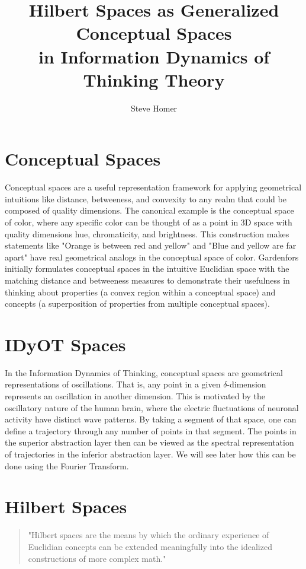\documentclass{MastersDoctoralThesis}
\title{\textbf{Hilbert Spaces as Generalized Conceptual Spaces} \\
in Information Dynamics of Thinking Theory}
\author{Steve Homer}
\begin{document}
\maketitle

\section{Conceptual Spaces}
Conceptual spaces are a useful representation framework for applying geometrical intuitions like distance, betweeness, and convexity to any realm that could be composed of quality dimensions.  The canonical example is the conceptual space of color, where any specific color can be thought of as a point in 3D space with quality dimensions hue, chromaticity, and brightness.  This construction makes statements like "Orange is between red and yellow" and "Blue and yellow are far apart" have real geometrical analogs in the conceptual space of color.  Gardenfors initially formulates conceptual spaces in the intuitive Euclidian space with the matching distance and betweeness measures to demonstrate their usefulness in thinking about properties (a convex region within a conceptual space) and concepts (a superposition of properties from multiple conceptual spaces). 

\section{IDyOT Spaces}
In the Information Dynamics of Thinking, conceptual spaces are geometrical representations of oscillations.  That is, any point in a given $\delta$-dimension represents an oscillation in another dimension. This is motivated by the oscillatory nature of the human brain, where the electric fluctuations of neuronal activity have distinct wave patterns. By taking a segment of that space, one can define a trajectory through any number of points in that segment.  The points in the superior abstraction layer then can be viewed as the spectral representation of trajectories in the inferior abstraction layer.  We will see later how this can be done using the Fourier Transform.

\section{Hilbert Spaces}

\begin{quote}
  "Hilbert spaces are the means by which the ordinary experience of Euclidian concepts can be extended meaningfully into the idealized constructions of more complex math."
\end{quote}
\end{document}
